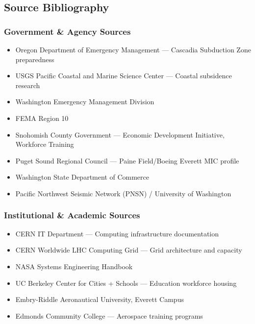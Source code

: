 \documentclass[11pt,letterpaper]{article}
\begin{document}
\subsection{Source Bibliography}

\subsubsection{Government \& Agency Sources}
\begin{itemize}[leftmargin=2em]
\item Oregon Department of Emergency Management --- Cascadia Subduction Zone preparedness
\item USGS Pacific Coastal and Marine Science Center --- Coastal subsidence research
\item Washington Emergency Management Division
\item FEMA Region 10
\item Snohomish County Government --- Economic Development Initiative, Workforce Training
\item Puget Sound Regional Council --- Paine Field/Boeing Everett MIC profile
\item Washington State Department of Commerce
\item Pacific Northwest Seismic Network (PNSN) / University of Washington
\end{itemize}

\subsubsection{Institutional \& Academic Sources}
\begin{itemize}[leftmargin=2em]
\item CERN IT Department --- Computing infrastructure documentation
\item CERN Worldwide LHC Computing Grid --- Grid architecture and capacity
\item NASA Systems Engineering Handbook
\item UC Berkeley Center for Cities + Schools --- Education workforce housing
\item Embry-Riddle Aeronautical University, Everett Campus
\item Edmonds Community College --- Aerospace training programs
\end{itemize}
\end{document}
